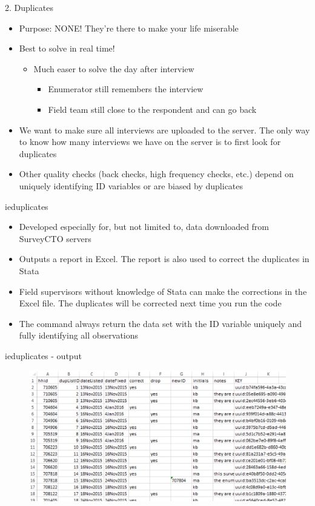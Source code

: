 \documentclass[aspectratio=169]{beamer}
\begin{document}
\begin{frame}{2. Duplicates}
\begin{itemize}
	\item Purpose: NONE! They’re there to make your life miserable
	\item Best to solve in real time!
		\begin{itemize}
			\item Much easer to solve the day after interview
				\begin{itemize}
					\item Enumerator still remembers the interview
					\item Field team still close to the respondent and can go back 
				\end{itemize}
		\end{itemize}
	\item We want to make sure all interviews are uploaded to the server. The only way to know how many interviews we have on the server is to first look for duplicates
	\item Other quality checks (back checks, high frequency checks, etc.) depend on uniquely identifying ID variables or are biased by duplicates
\end{itemize}
\end{frame}


\begin{frame}{ieduplicates}
\begin{itemize}
	\item Developed especially for, but not limited to, data downloaded from SurveyCTO servers
	\item Outputs a report in Excel. The report is also used to correct the duplicates in Stata
	\item Field supervisors without knowledge of Stata can make the corrections in the Excel file. The duplicates will be corrected next time you run the code
	\item The command always return the data set with the ID variable uniquely and fully identifying all observations
\end{itemize}
\end{frame}

\begin{frame}{ieduplicates - output}
	\begin{figure}
		\centering
		\includegraphics[width=\linewidth]{img/ieduplicates}
	\end{figure}
\end{frame}
\end{document}
